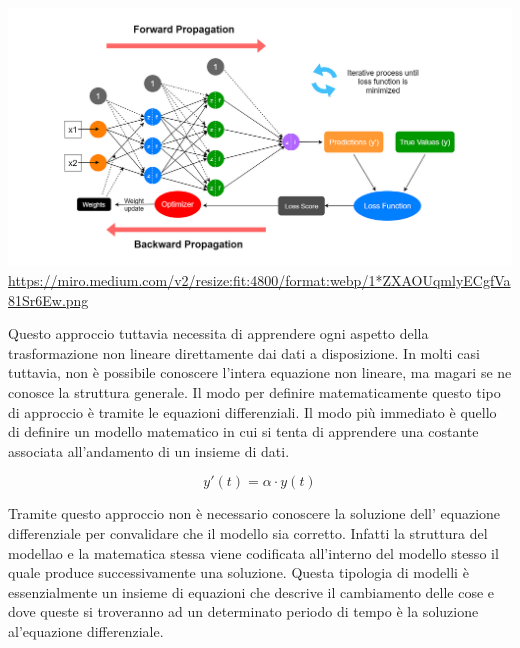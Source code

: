 \begin{minipage}{\linewidth}
    \centering
    \includegraphics[width=\textwidth]{img/1_ZXAOUqmlyECgfVa81Sr6Ew.png}
    \url{https://miro.medium.com/v2/resize:fit:4800/format:webp/1*ZXAOUqmlyECgfVa81Sr6Ew.png}
    \label{fig:NN_example}
\end{minipage}

Questo approccio tuttavia necessita di apprendere ogni aspetto della 
trasformazione non lineare direttamente dai dati a disposizione. In molti 
casi tuttavia, non è possibile conoscere l'intera equazione non lineare, 
ma magari se ne conosce la struttura generale. Il modo per definire 
matematicamente questo tipo di approccio è tramite le equazioni differenziali.
Il modo più immediato è quello di definire un modello matematico in 
cui si tenta di apprendere una costante associata all'andamento di un 
insieme di dati. 

$$y'(t) = \alpha \cdot y(t)$$

Tramite questo approccio non è necessario conoscere la soluzione dell'
equazione differenziale per convalidare che il modello sia corretto. Infatti 
la struttura del modellao e la matematica stessa viene codificata all'interno 
del modello stesso  il quale produce successivamente una soluzione. Questa 
tipologia di modelli è essenzialmente un insieme di equazioni che descrive 
il cambiamento delle cose e dove queste si troveranno ad un determinato periodo di tempo
è la soluzione al'equazione differenziale.

